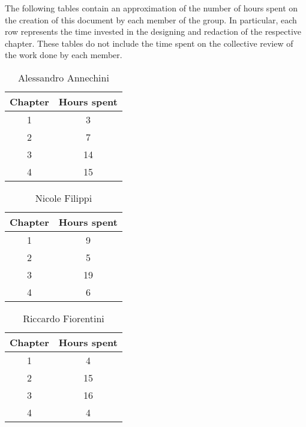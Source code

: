 The following tables contain an approximation of the number of hours spent on the creation of this document by each member of the group. In particular, each row represents the time invested in the designing and redaction of the respective chapter. These tables do not include the time spent on the collective review of the work done by each member.


\begin{table}[h!]
  \centering
  \begin{tabular}{|c|c|}
    \hline
    Chapter & Hours spent \\
    \hline
    1 & 3\\
    \hline
    2 & 7\\
    \hline
    3 & 14\\
    \hline
    4 & 15\\
    \hline
  \end{tabular}
  \caption{Alessandro Annechini}
  \label{tab:Alessandro_Annechini_hours}
\end{table}

\begin{table}[h!]
  \centering
  \begin{tabular}{|c|c|}
    \hline
    Chapter & Hours spent \\
    \hline
    1 & 9\\
    \hline
    2 & 5\\
    \hline
    3 & 19\\
    \hline
    4 & 6\\
    \hline
  \end{tabular}
  \caption{Nicole Filippi}
  \label{tab:Nicole_Filippi_hours}
\end{table}

\begin{table}[h!]
  \centering
  \begin{tabular}{|c|c|}
    \hline
    Chapter & Hours spent \\
    \hline
    1 & 4\\
    \hline
    2 & 15\\
    \hline
    3 & 16\\
    \hline
    4 & 4\\
    \hline
  \end{tabular}
  \caption{Riccardo Fiorentini}
  \label{tab:Riccardo_Fiorentini_hours}
\end{table}